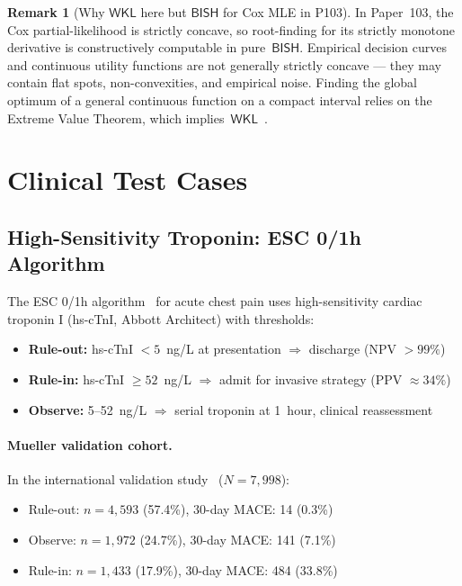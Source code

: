 \documentclass[11pt,a4paper]{article}
\theoremstyle{plain}
\theoremstyle{definition}
\newtheorem{remark}[theorem]{Remark}
\newcommand{\BISH}{\textsf{BISH}}
\newcommand{\WKL}{\textsf{WKL}}
\begin{document}
\begin{remark}[Why $\WKL$ here but $\BISH$ for Cox MLE in P103]\label{rmk:wkl-defense}
In Paper~103, the Cox partial-likelihood is strictly concave, so root-finding for its strictly monotone derivative is constructively computable in pure~$\BISH$.  Empirical decision curves and continuous utility functions are not generally strictly concave --- they may contain flat spots, non-convexities, and empirical noise.  Finding the global optimum of a general continuous function on a compact interval relies on the Extreme Value Theorem, which implies~$\WKL$~\cite{lee-crm-p50}.
\end{remark}

\section{Clinical Test Cases}\label{sec:clinical}

\subsection{High-Sensitivity Troponin: ESC 0/1h Algorithm}

The ESC 0/1h algorithm~\cite{collet-esc2020,mueller2019} for acute chest pain uses high-sensitivity cardiac troponin I (hs-cTnI, Abbott Architect) with thresholds:
\begin{itemize}[nosep]
\item \textbf{Rule-out:} hs-cTnI $< 5$~ng/L at presentation $\Rightarrow$ discharge (NPV $> 99\%$)
\item \textbf{Rule-in:} hs-cTnI $\geq 52$~ng/L $\Rightarrow$ admit for invasive strategy (PPV $\approx 34\%$)
\item \textbf{Observe:} 5--52~ng/L $\Rightarrow$ serial troponin at 1~hour, clinical reassessment
\end{itemize}

\paragraph{Mueller validation cohort.}  In the international validation study~\cite{mueller2019} ($N = 7{,}998$):
\begin{itemize}[nosep]
\item Rule-out: $n = 4{,}593$ (57.4\%), 30-day MACE: 14 (0.3\%)
\item Observe: $n = 1{,}972$ (24.7\%), 30-day MACE: 141 (7.1\%)
\item Rule-in: $n = 1{,}433$ (17.9\%), 30-day MACE: 484 (33.8\%)
\end{itemize}
\end{document}
